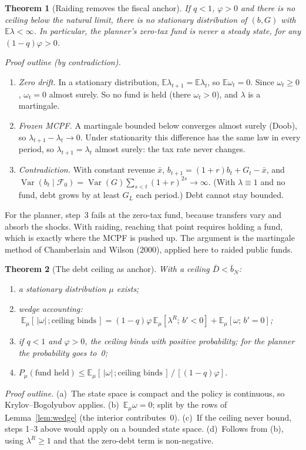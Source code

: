 \documentclass[11pt]{article}
\newtheorem{theorem}{Theorem}
\newcommand{\E}{\mathbb{E}}
\begin{document}
\begin{theorem}[Raiding removes the fiscal anchor]\label{thm:anchor}
If $q<1$, $\varphi>0$ and there is no ceiling below the natural limit, there is no stationary distribution of $(b,G)$ with $\E\lambda<\infty$. In particular, the planner's zero-tax fund is never a steady state, for any $(1-q)\varphi>0$.
\end{theorem}
\noindent\emph{Proof outline (by contradiction).}
\begin{enumerate}
\item \emph{Zero drift.} In a stationary distribution, $\E\lambda_{t+1}=\E\lambda_t$, so $\E\omega_t=0$. Since $\omega_t\ge0$, $\omega_t=0$ almost surely. So no fund is held (there $\omega_t>0$), and $\lambda$ is a martingale.
\item \emph{Frozen MCPF.} A martingale bounded below converges almost surely (Doob), so $\lambda_{t+1}-\lambda_t\to0$. Under stationarity this difference has the same law in every period, so $\lambda_{t+1}=\lambda_t$ almost surely: the tax rate never changes.
\item \emph{Contradiction.} With constant revenue $\bar x$, $b_{t+1}=(1+r)b_t+G_t-\bar x$, and $\operatorname{Var}(b_t\mid\mathcal F_0)=\operatorname{Var}(G)\sum_{s<t}(1+r)^{2s}\to\infty$. (With $\lambda\equiv1$ and no fund, debt grows by at least $G_L$ each period.) Debt cannot stay bounded.
\end{enumerate}
For the planner, step~3 fails at the zero-tax fund, because transfers vary and absorb the shocks. With raiding, reaching that point requires holding a fund, which is exactly where the MCPF is pushed up. The argument is the martingale method of Chamberlain and Wilson (2000), applied here to raided public funds.

\begin{theorem}[The debt ceiling as anchor]
With a ceiling $\bar D<\bar b_N$:
\begin{enumerate}[label=(\alph*)]
\item a stationary distribution $\mu$ exists;
\item \emph{wedge accounting}: $\;\E_\mu[\,|\omega|\,;\text{ceiling binds}\,]=(1-q)\varphi\,\E_\mu[\lambda^R;\,b'<0]+\E_\mu[\omega;\,b'=0]$;
\item if $q<1$ and $\varphi>0$, the ceiling binds with positive probability; for the planner the probability goes to~0;
\item $P_\mu(\text{fund held})\le \E_\mu[\,|\omega|\,;\text{ceiling binds}\,]\,/\,[(1-q)\varphi]$.
\end{enumerate}
\end{theorem}
\noindent\emph{Proof outline.} (a)~The state space is compact and the policy is continuous, so Krylov--Bogolyubov applies. (b)~$\E_\mu\omega=0$; split by the rows of Lemma~\ref{lem:wedge} (the interior contributes~0). (c)~If the ceiling never bound, steps 1--3 above would apply on a bounded state space. (d)~Follows from (b), using $\lambda^R\ge1$ and that the zero-debt term is non-negative.
\end{document}
